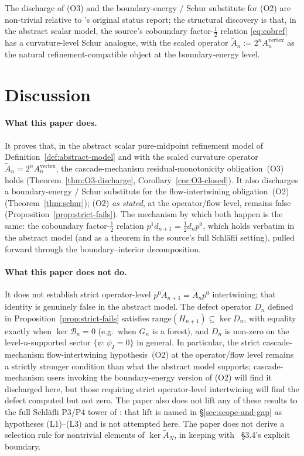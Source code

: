 \documentclass[11pt]{article}
\theoremstyle{plain}
\theoremstyle{definition}
\theoremstyle{remark}
\begin{document}
The discharge of (O3) and the boundary-energy / Schur substitute
for (O2) are non-trivial relative to
\cite{CascadeMechanism}'s original status
report; the structural discovery is that, in the abstract scalar
model, the source's coboundary factor-$\tfrac12$ relation
\eqref{eq:cobref} has a curvature-level Schur analogue, with the
scaled operator $\widetilde A_n := 2^n A_n^{\mathrm{vertex}}$ as the
natural refinement-compatible object at the boundary-energy level.

\section{Discussion}\label{sec:discussion}

\paragraph*{What this paper does.}
It proves that, in the abstract scalar pure-midpoint refinement
model of Definition~\ref{def:abstract-model} and with the scaled
curvature operator $\widetilde A_n = 2^n A_n^{\mathrm{vertex}}$,
the cascade-mechanism residual-monotonicity obligation~(O3) holds
(Theorem~\ref{thm:O3-discharge}, Corollary~\ref{cor:O3-closed}). It
also discharges a boundary-energy / Schur substitute for the
flow-intertwining obligation~(O2) (Theorem~\ref{thm:schur}); (O2)
\emph{as stated}, at the operator/flow level, remains false
(Proposition~\ref{prop:strict-fails}). The
mechanism by which both happen is the same: the coboundary
factor-$\tfrac12$ relation
$p^{1} d_{n+1} = \tfrac12 d_n p^{0}$, which holds verbatim in the
abstract model (and as a theorem in the source's full Schl\"{a}fli
setting), pulled forward through the boundary--interior
decomposition.

\paragraph*{What this paper does not do.}
It does not establish strict operator-level
$p^{0} \widetilde A_{n+1} = \widetilde A_n p^{0}$
intertwining; that identity is genuinely false in the abstract
model. The defect operator $D_n$ defined in
Proposition~\ref{prop:strict-fails} satisfies
$\mathrm{range}(H_{n+1}) \subseteq \ker D_n$, with equality exactly
when $\ker \mathcal{B}_n = 0$ (e.g.\ when $G_n$ is a forest), and $D_n$ is
non-zero on the level-$n$-supported sector
$\{\psi : \psi_I = 0\}$ in general. In particular, the strict
cascade-mechanism flow-intertwining hypothesis~(O2) at the
operator/flow level remains a strictly stronger condition than
what the abstract model supports; cascade-mechanism users invoking
the boundary-energy version of (O2) will find it discharged here,
but those requiring strict operator-level intertwining will find
the defect computed but not zero. The paper also does not lift any
of these results to the full Schl\"{a}fli P3/P4 tower of
\cite{CascadeRefinementSpaces, CascadeClosureDynamics}: that lift
is named in
\S\ref{sec:scope-and-gap} as hypotheses
\textup{(L1)}--\textup{(L3)} and is not attempted here. The paper
does not derive a selection rule for nontrivial elements of
$\ker \widetilde A_N$, in keeping with
\cite{CascadeMechanism}~\S3.4's explicit boundary.
\end{document}
